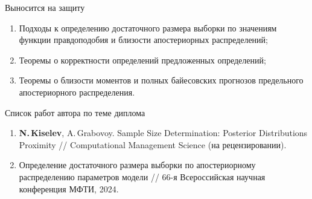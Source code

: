 \documentclass{beamer}
\begin{document}
\begin{frame}{Выносится на защиту}
    \begin{enumerate}
        \item Подходы к определению достаточного размера выборки по
        значениям функции правдоподобия и близости апостериорных распределений; 
        \item Теоремы о корректности определений предложенных определений;
        \item Теоремы о близости моментов и полных байесовских прогнозов предельного апостериорного распределения.
    \end{enumerate}
    \begin{block}{Список работ автора по теме диплома}
        \begin{enumerate}
        \item \textbf{N.\,Kiselev}, A.\,Grabovoy. Sample Size Determination: Posterior Distributions Proximity // Computational Management Science (на рецензировании).
        \item Определение достаточного размера выборки по апостериорному распределению параметров модели // 66-я Всероссийская научная конференция МФТИ, 2024.
        \end{enumerate}
    \end{block}
\end{frame}
\end{document}
